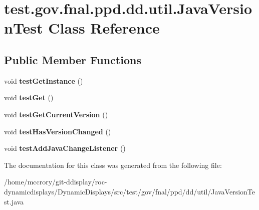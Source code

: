 \hypertarget{classtest_1_1gov_1_1fnal_1_1ppd_1_1dd_1_1util_1_1JavaVersionTest}{\section{test.\-gov.\-fnal.\-ppd.\-dd.\-util.\-Java\-Version\-Test Class Reference}
\label{classtest_1_1gov_1_1fnal_1_1ppd_1_1dd_1_1util_1_1JavaVersionTest}
}
\subsection*{Public Member Functions}
\begin{DoxyCompactItemize}
\item 
\hypertarget{classtest_1_1gov_1_1fnal_1_1ppd_1_1dd_1_1util_1_1JavaVersionTest_a26ff2a21a2ccdeb1ec8d831fd679487f}{void {\bfseries test\-Get\-Instance} ()}\label{classtest_1_1gov_1_1fnal_1_1ppd_1_1dd_1_1util_1_1JavaVersionTest_a26ff2a21a2ccdeb1ec8d831fd679487f}

\item 
\hypertarget{classtest_1_1gov_1_1fnal_1_1ppd_1_1dd_1_1util_1_1JavaVersionTest_a2827e884cee62781c717ed06d9fe869e}{void {\bfseries test\-Get} ()}\label{classtest_1_1gov_1_1fnal_1_1ppd_1_1dd_1_1util_1_1JavaVersionTest_a2827e884cee62781c717ed06d9fe869e}

\item 
\hypertarget{classtest_1_1gov_1_1fnal_1_1ppd_1_1dd_1_1util_1_1JavaVersionTest_ac6b4218413e228de9a47a4643894678e}{void {\bfseries test\-Get\-Current\-Version} ()}\label{classtest_1_1gov_1_1fnal_1_1ppd_1_1dd_1_1util_1_1JavaVersionTest_ac6b4218413e228de9a47a4643894678e}

\item 
\hypertarget{classtest_1_1gov_1_1fnal_1_1ppd_1_1dd_1_1util_1_1JavaVersionTest_aa2efba73d36ed6d93bbe8915c4838932}{void {\bfseries test\-Has\-Version\-Changed} ()}\label{classtest_1_1gov_1_1fnal_1_1ppd_1_1dd_1_1util_1_1JavaVersionTest_aa2efba73d36ed6d93bbe8915c4838932}

\item 
\hypertarget{classtest_1_1gov_1_1fnal_1_1ppd_1_1dd_1_1util_1_1JavaVersionTest_aae93ddb32a8d9cd0b00194dd5d7597e5}{void {\bfseries test\-Add\-Java\-Change\-Listener} ()}\label{classtest_1_1gov_1_1fnal_1_1ppd_1_1dd_1_1util_1_1JavaVersionTest_aae93ddb32a8d9cd0b00194dd5d7597e5}

\end{DoxyCompactItemize}


The documentation for this class was generated from the following file\-:\begin{DoxyCompactItemize}
\item 
/home/mccrory/git-\/ddisplay/roc-\/dynamicdisplays/\-Dynamic\-Displays/src/test/gov/fnal/ppd/dd/util/Java\-Version\-Test.\-java\end{DoxyCompactItemize}
